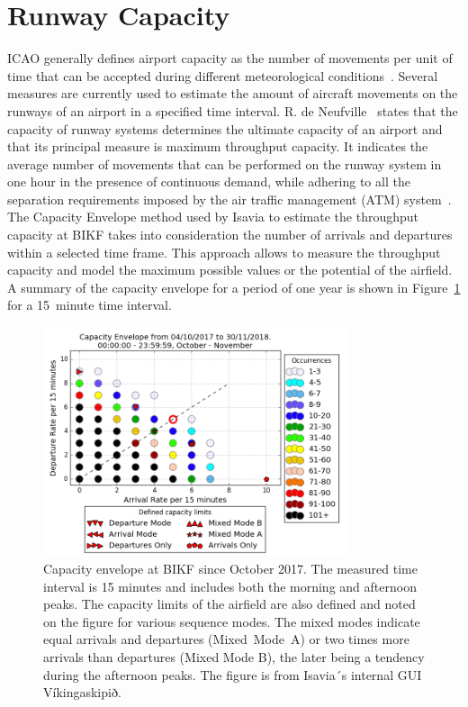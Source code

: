 \section{Runway Capacity\label{sec:runway_capacity}}

ICAO generally defines airport capacity as the number of movements per unit of time that can be accepted during different meteorological conditions~\cite{airport_capacity_methodology}. 
Several measures are currently used to estimate the amount of aircraft movements on the runways of an airport in a specified time interval.
R. de Neufville~\cite{de_neufville_airport_2013} states that the capacity of runway systems determines the ultimate capacity of an airport and that its principal measure is maximum throughput capacity. It indicates the average number of movements that can be performed on the runway system in one hour in the presence of continuous demand, while adhering to all the separation requirements imposed by the air traffic management (ATM) system~\cite{de_neufville_airport_2013}.
The Capacity Envelope method used by Isavia to estimate the throughput capacity at BIKF takes into consideration the number of arrivals and departures within a selected time frame. This approach allows to measure the throughput capacity and model the maximum possible values or the potential of the airfield. A summary of the capacity envelope for a period of one year is shown in Figure~\ref{fig:capacity_evnelope} for a 15~minute time interval. 

\begin{figure}[h]
    \centering
    \includegraphics[width=0.8\textwidth]{graphics/fig_Capacity_Envelope_2017-10-04_to_2018-11-30_15min_occurrences_limits.png}
    \caption[Capacity envelope for BIKF]{Capacity envelope at BIKF since October 2017. The measured time interval is 15 minutes and includes both the morning and afternoon peaks. The capacity limits of the airfield are also defined and noted on the figure for various sequence modes. The mixed modes indicate equal arrivals and departures (Mixed~Mode~A) or two times more arrivals than departures (Mixed Mode B), the later being a tendency during the afternoon peaks. The figure is from Isavia´s internal GUI Víkingaskipið.}  \label{fig:capacity_evnelope}
\end{figure}

